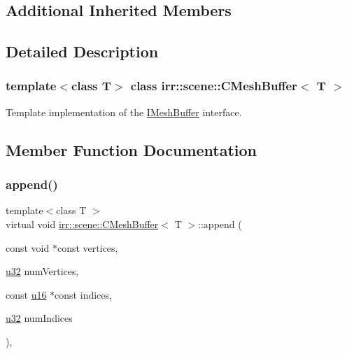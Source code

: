 \subsection*{Additional Inherited Members}


\subsection{Detailed Description}
\subsubsection*{template$<$class T$>$\newline
class irr\+::scene\+::\+C\+Mesh\+Buffer$<$ T $>$}

Template implementation of the \hyperlink{classirr_1_1scene_1_1IMeshBuffer}{I\+Mesh\+Buffer} interface. 

\subsection{Member Function Documentation}
\mbox{\label{classirr_1_1scene_1_1CMeshBuffer_a7efd85cba5d5d86bee8c2ea2fe0524d9}} 
\subsubsection{\texorpdfstring{append()}{append()}\hspace{0.1cm}{\footnotesize\ttfamily [1/4]}}
{\footnotesize\ttfamily template$<$class T $>$ \\
virtual void \hyperlink{classirr_1_1scene_1_1CMeshBuffer}{irr\+::scene\+::\+C\+Mesh\+Buffer}$<$ T $>$\+::append (\begin{DoxyParamCaption}\item[{const void $\ast$const}]{vertices,  }\item[{\hyperlink{namespaceirr_a0416a53257075833e7002efd0a18e804}{u32}}]{num\+Vertices,  }\item[{const \hyperlink{namespaceirr_ae9f8ec82692ad3b83c21f555bfa70bcc}{u16} $\ast$const}]{indices,  }\item[{\hyperlink{namespaceirr_a0416a53257075833e7002efd0a18e804}{u32}}]{num\+Indices }\end{DoxyParamCaption})\hspace{0.3cm}{\ttfamily [inline]}, {\ttfamily [virtual]}}



